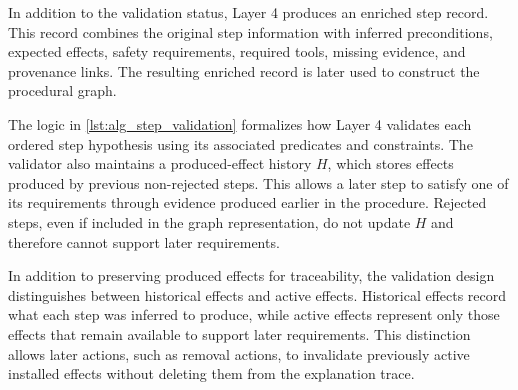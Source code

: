 In addition to the validation status, Layer 4 produces an enriched step record. This record combines the original step information with inferred preconditions, expected effects, safety requirements, required tools, missing evidence, and provenance links. The resulting enriched record is later used to construct the procedural graph. 

The logic in \cref{lst:alg_step_validation} formalizes how Layer 4 validates each ordered step hypothesis using its associated predicates and constraints. The validator also maintains a produced-effect history $H$, which stores effects produced by previous non-rejected steps. This allows a later step to satisfy one of its requirements through evidence produced earlier in the procedure. Rejected steps, even if included in the graph representation, do not update $H$ and therefore cannot support later requirements.

In addition to preserving produced effects for traceability, the validation design distinguishes between historical effects and active effects. Historical effects record what each step was inferred to produce, while active effects represent only those effects that remain available to support later requirements. This distinction allows later actions, such as removal actions, to invalidate previously active installed effects without deleting them from the explanation trace.



